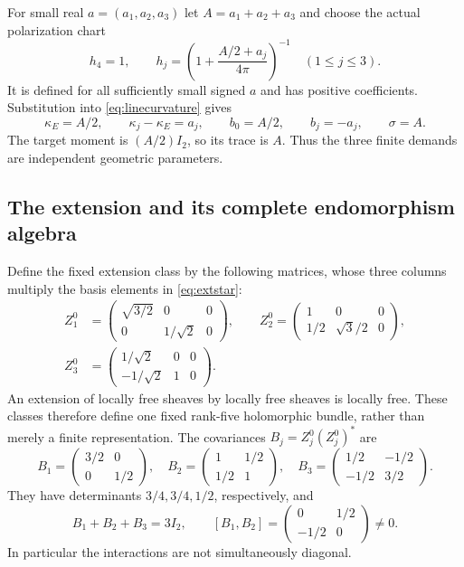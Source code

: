 For small real $a=(a_1,a_2,a_3)$ let $A=a_1+a_2+a_3$ and choose
the actual polarization chart
\begin{equation}\label{eq:chart}
h_4=1,\qquad
h_j=\left(1+\frac{A/2+a_j}{4\pi}\right)^{-1}\quad(1\le j\le3).
\end{equation}
It is defined for all sufficiently small signed $a$ and has
positive coefficients. Substitution into \eqref{eq:linecurvature}
gives
\begin{equation}\label{eq:demands}
\kappa_E=A/2,\qquad\kappa_j-\kappa_E=a_j,\qquad
b_0=A/2,\qquad b_j=-a_j,\qquad\sigma=A.
\end{equation}
The target moment is $(A/2)I_2$, so its trace is $A$. Thus the
three finite demands are independent geometric parameters.

\subsection{The extension and its complete endomorphism algebra}
Define the fixed extension class by the following matrices, whose
three columns multiply the basis elements in \eqref{eq:extstar}:
\begin{equation}\label{eq:Zstar}
\begin{split}
Z_1^0&=\begin{pmatrix}\sqrt{3/2}&0&0\\0&1/\sqrt2&0\end{pmatrix},\qquad
Z_2^0=\begin{pmatrix}1&0&0\\1/2&\sqrt3/2&0\end{pmatrix},\\
Z_3^0&=\begin{pmatrix}1/\sqrt2&0&0\\-1/\sqrt2&1&0\end{pmatrix}.
\end{split}
\end{equation}
An extension of locally free sheaves by locally free sheaves is
locally free. These classes therefore define one fixed rank-five
holomorphic bundle, rather than merely a finite representation.
The covariances $B_j=Z_j^0(Z_j^0)^*$ are
\begin{equation}\label{eq:Bstar}
B_1=\begin{pmatrix}3/2&0\\0&1/2\end{pmatrix},\quad
B_2=\begin{pmatrix}1&1/2\\1/2&1\end{pmatrix},\quad
B_3=\begin{pmatrix}1/2&-1/2\\-1/2&3/2\end{pmatrix}.
\end{equation}
They have determinants $3/4,3/4,1/2$, respectively, and
\begin{equation}\label{eq:noncommute}
B_1+B_2+B_3=3I_2,\qquad
[B_1,B_2]=\begin{pmatrix}0&1/2\\-1/2&0\end{pmatrix}\ne0.
\end{equation}
In particular the interactions are not simultaneously diagonal.

